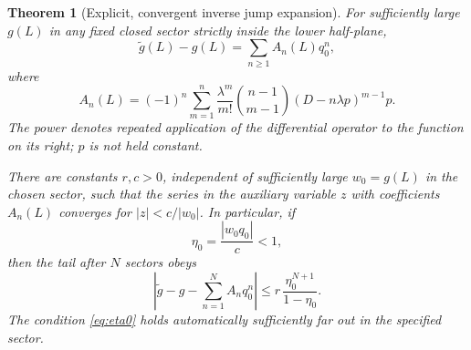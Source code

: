 \documentclass[11pt,a4paper]{article}
\newtheorem{theorem}{Theorem}[section]
\theoremstyle{definition}
\numberwithin{equation}{section}
\begin{document}
\begin{theorem}[Explicit, convergent inverse jump expansion]
\label{thm:stokes}
For sufficiently large $g(L)$ in any fixed closed sector strictly inside the lower half-plane,
\begin{equation}
 \widetilde g(L)-g(L)=\sum_{n\ge1}A_n(L)q_0^n,
 \label{eq:inverse-jump}
\end{equation}
where
\begin{equation}
 \boxed{\displaystyle
 A_n(L)=(-1)^n\sum_{m=1}^{n}
    \frac{\lambda^m}{m!}\binom{n-1}{m-1}
             (D-n\lambda p)^{m-1}p.}
 \label{eq:An}
\end{equation}
The power denotes repeated application of the differential operator to the function on its right; $p$ is not held constant.

There are constants $r,c>0$, independent of sufficiently large $w_0=g(L)$ in the chosen sector, such that the series in the auxiliary variable $z$ with coefficients $A_n(L)$ converges for $|z|<c/|w_0|$. In particular, if
\begin{equation}
 \eta_0=\frac{|w_0q_0|}{c}<1,
 \label{eq:eta0}
\end{equation}
then the tail after $N$ sectors obeys
\begin{equation}
 \left|\widetilde g-g-\sum_{n=1}^NA_nq_0^n\right|
 \le r\,\frac{\eta_0^{N+1}}{1-\eta_0}.
 \label{eq:stokes-tail}
\end{equation}
The condition \eqref{eq:eta0} holds automatically sufficiently far out in the specified sector.
\end{theorem}
\end{document}
